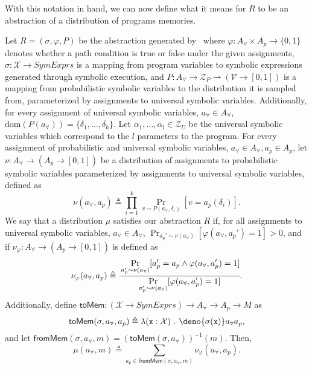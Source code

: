 \documentclass[acmsmall,review,anonymous]{acmart}\settopmatter{printfolios=true,printccs=false,printacmref=false}
\newcommand*\dom[1]{\mathrm{dom}\left( #1 \right)}
\begin{document}
With this notation in hand, we can now define what it means for $R$ to be an abstraction of a distribution of programs memories.
\begin{definition}
  \label{def:main}
  Let $R = (\sigma,\varphi,P)$ be the abstraction generated by~ where $\varphi: \mathit{A}_{\forall} \times \mathit{A}_p \rightarrow \{0,1\}$ denotes whether a path condition is true or false under the given assignments, $\sigma : \mathcal{X} \rightarrow SymExprs$ is a mapping from program variables to symbolic expressions generated through symbolic execution, and $P : \mathit{A}_{\forall} \rightarrow \mathcal{Z}_P \rightharpoonup (\mathcal{V} \rightarrow [0,1])$ is a mapping from probabilistic symbolic variables to the distribution it is sampled from, parameterized by assignments to universal symbolic variables.
  Additionally, for every assignment of universal symbolic variables, $a_{\forall} \in \mathit{A}_{\forall}$, $\dom{P(a_{\forall})} = \{\delta_1,\ldots,\delta_k\}$.
  Let $\alpha_1,\ldots,\alpha_l \in \mathcal{Z}_U$ be the universal symbolic variables which correspond to the $l$ parameters to the program.
  For every assignment of probabilistic and universal symbolic variables, $a_{\forall} \in \mathit{A}_{\forall}, a_p \in \mathit{A}_p$, let $\nu : \mathit{A}_{\forall} \rightarrow (\mathit{A}_p \rightarrow [0,1])$ be a distribution of assignments to probabilistic symbolic variables parameterized by assignments to universal symbolic variables, defined as
  \[
    \nu(a_{\forall},a_p) \triangleq \prod_{i=1}^k \Pr_{v \sim P(a_{\forall},\delta_i)}[v = a_p(\delta_i)].
  \]
  We say that a distribution $\mu$ satisfies our abstraction $R$ if, for all assignments to universal symbolic variables, $a_{\forall} \in \mathit{A}_{\forall}$, $\Pr_{a_p' \sim \nu(a_{\forall})}[\varphi(a_{\forall},a_p') = 1] > 0$, and if $\nu_{\varphi} : \mathit{A}_{\forall} \rightarrow (\mathit{A}_p \rightarrow [0,1])$ is defined as
  \[
    \nu_\varphi(a_{\forall},a_p) \triangleq \cfrac{\displaystyle\Pr_{a_p' \sim \nu(a_{\forall})}[a_p' = a_p \land \varphi(a_{\forall},a_p') = 1]}{\displaystyle\Pr_{a_p' \sim \nu(a_{\forall})}[\varphi(a_{\forall},a_p')=1]}.
  \]
  Additionally, define $\mathsf{toMem} : (\mathcal{X} \rightarrow SymExprs) \rightarrow \mathit{A}_{\forall} \rightarrow \mathit{A}_p \rightarrow M$ as
  \begin{equation*}
    \mathsf{toMem}(\sigma,a_{\forall},a_p) \triangleq \lambda (\mathtt{x}: \mathcal{X})~.~\deno{\sigma(\mathtt{x})}a_{\forall}a_p,
  \end{equation*}
  and let $\mathsf{fromMem}(\sigma,a_{\forall},m) = (\mathsf{toMem}(\sigma,a_{\forall}))^{-1}(m)$.
  Then,
  \[
    \mu(a_{\forall},m) \triangleq \sum_{a_p \in \mathsf{fromMem}(\sigma,a_{\forall},m)} \nu_{\varphi}(a_{\forall},a_p).
  \]
\end{definition}
\end{document}
